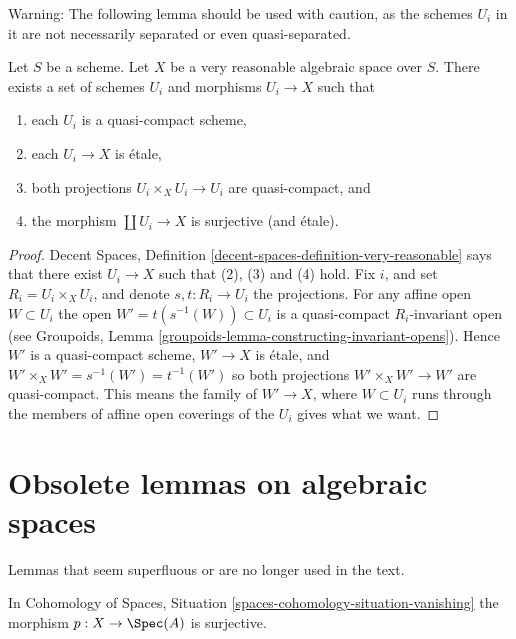\noindent
Warning: The following lemma should be used with caution, as the schemes
$U_i$ in it are not necessarily separated or even quasi-separated.

\begin{lemma}
\label{lemma-very-reasonable-quasi-compact-pieces}
Let $S$ be a scheme.
Let $X$ be a very reasonable algebraic space over $S$.
There exists a set of schemes
$U_i$ and morphisms $U_i \to X$ such that
\begin{enumerate}
\item each $U_i$ is a quasi-compact scheme,
\item each $U_i \to X$ is \'etale,
\item both projections $U_i \times_X U_i \to U_i$ are quasi-compact, and
\item the morphism $\coprod U_i \to X$ is surjective (and \'etale).
\end{enumerate}
\end{lemma}

\begin{proof}
Decent Spaces, Definition \ref{decent-spaces-definition-very-reasonable}
says that there exist $U_i \to X$ such that (2), (3) and (4) hold.
Fix $i$, and set $R_i = U_i \times_X U_i$, and denote $s, t : R_i \to U_i$
the projections.
For any affine open $W \subset U_i$ the open $W' = t(s^{-1}(W)) \subset U_i$
is a quasi-compact $R_i$-invariant open (see
Groupoids, Lemma \ref{groupoids-lemma-constructing-invariant-opens}).
Hence $W'$ is a quasi-compact scheme, $W' \to X$ is \'etale, and
$W' \times_X W' = s^{-1}(W') = t^{-1}(W')$ so both projections
$W' \times_X W' \to W'$ are quasi-compact. This means the family of
$W' \to X$, where $W \subset U_i$ runs through the members of affine
open coverings of the $U_i$ gives what we want.
\end{proof}




\section{Obsolete lemmas on algebraic spaces}
\label{section-obsolete-on-spaces}

\noindent
Lemmas that seem superfluous or are no longer used in the text.

\begin{lemma}
\label{lemma-vanishing-surjective}
In Cohomology of Spaces, Situation \ref{spaces-cohomology-situation-vanishing}
the morphism $p : X \to \Spec(A)$ is surjective.
\end{lemma}

